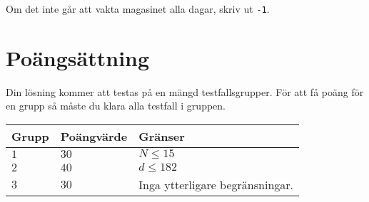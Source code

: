 Om det inte går att vakta magasinet alla dagar, skriv ut \texttt{-1}.

\section*{Poängsättning}
Din lösning kommer att testas på en mängd testfallsgrupper.
För att få poäng för en grupp så måste du klara alla testfall i gruppen.

\noindent
\begin{tabular}{| l | l | l |}
\hline
Grupp & Poängvärde & Gränser \\ \hline
$1$   & $30$       & $N \leq 15$ \\ \hline
$2$   & $40$       & $d \leq 182$ \\ \hline
$3$   & $30$       & Inga ytterligare begränsningar. \\ \hline
\end{tabular}

